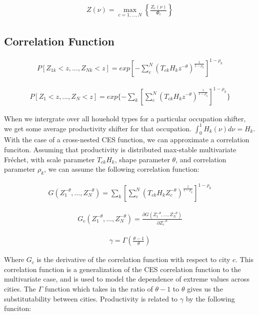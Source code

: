 \documentclass[10pt]{article}
\begin{document}
\begin{align}
    Z(\nu) = \max_{c = 1, \dots, N} \left\{\frac{Z_c(\nu)}{\Phi_c}\right\}
\end{align}

\subsection{Correlation Function}

\begin{align}
    P[Z_{1k} < z, \dots, Z_{Nk} < z] = exp[-\sum_{c}^{N}(T_{ck} H_k z^{-\theta})^{\frac{1}{1 - \rho_k}}]^{1 - \rho_k}
\end{align}

\begin{align}
    P[Z_1 < z, \dots, Z_N < z] = exp\{- \sum_{k}^{}[\sum_{c}^{N}(T_{ck} H_k z^{-\theta})^{\frac{1}{1 - \rho_k}}]^{1 - \rho_k}\}
\end{align}

When we intergrate over all houehold types for a particular occupation shifter, we get some average productivity shifter for that occupation. $\int_{0}^{1} H_k (\nu) d\nu = H_k$. With the case of a cross-nested CES function, we can approximate a correlation funciton. Assuming that productivity is distributed max-stable multivariate Fréchet, with scale parameter $T_{ck} H_k$, shape parameter $\theta$, and correlation parameter $\rho_k$, we can assume the following correlation function:

\begin{align}
    G (Z_1^{-\theta}, \dots, Z_N^{-\theta})= \sum_{k}^{} [\sum_{c}^{N} (T_{ck} H_k Z_c^{-\theta})^{\frac{1}{1 - \rho_k}}]^{1 - \rho_k}
\end{align}

\begin{align}
    G_c (Z_1^{-\theta}, \dots, Z_N^{-\theta}) = \frac{\partial G (Z_1^{-\theta}, \dots, Z_N^{-\theta})}{\partial Z_c^{-\theta}}
\end{align}

\begin{align}
    \gamma = \Gamma (\frac{\theta - 1}{\theta})
\end{align}

Where $G_c$ is the derivative of the correlation function with respect to city $c$. This correlation function is a generalization of the CES correlation function to the multivariate case, and is used to model the dependence of extreme values across cities. The $\Gamma$ function which takes in the ratio of $\theta - 1$ to $\theta$ gives us the substitutability between cities. Productivity is related to $\gamma$ by the following funciton:
\end{document}
